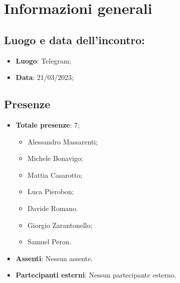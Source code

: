 \section{Informazioni generali}
    \subsection{Luogo e data dell'incontro:}
    \begin{itemize}
        \item \textbf{Luogo}: Telegram;
        \item \textbf{Data}: 21/03/2023;
    \end{itemize}
    \subsection{Presenze}
    \begin{itemize}
        \item \textbf{Totale presenze}: 7;
        \begin{itemize}
            \item Alessandro Massarenti;
            \item Michele Bonavigo;
            \item Mattia Casarotto;
            \item Luca Pierobon;
            \item Davide Romano.
            \item Giorgio Zarantonello;
            \item Samuel Peron.
        \end{itemize}
        \item \textbf{Assenti}: Nessun assente.
        \item \textbf{Partecipanti esterni}: Nessun partecipante esterno.
    \end{itemize}
